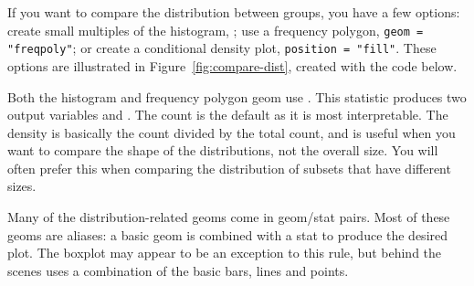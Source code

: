 If you want to compare the distribution between groups, you have a few options: create small multiples of the histogram, ; use a frequency polygon, {\tt geom = "freqpoly"}; or create a conditional density plot, {\tt position = "fill"}. These options are illustrated in Figure~\ref{fig:compare-dist}, created with the code below.    

% 


\noindent Both the histogram and frequency polygon geom use .  This statistic produces two output variables  and .  The count is the default as it is most interpretable.  The density is basically the count divided by the total count, and is useful when you want to compare the shape of the distributions, not the overall size.  You will often prefer this when comparing the distribution of subsets that have different sizes. 

Many of the distribution-related geoms come in geom/stat pairs.  Most of these geoms are aliases: a basic geom is combined with a stat to produce the desired plot.  The boxplot may appear to be an exception to this rule, but behind the scenes  uses a combination of the basic bars, lines and points.

